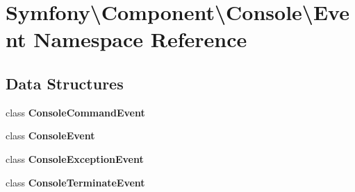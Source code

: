 \section{Symfony\textbackslash{}Component\textbackslash{}Console\textbackslash{}Event Namespace Reference}
\label{namespace_symfony_1_1_component_1_1_console_1_1_event}
\subsection*{Data Structures}
\begin{DoxyCompactItemize}
\item 
class {\bf Console\+Command\+Event}
\item 
class {\bf Console\+Event}
\item 
class {\bf Console\+Exception\+Event}
\item 
class {\bf Console\+Terminate\+Event}
\end{DoxyCompactItemize}
